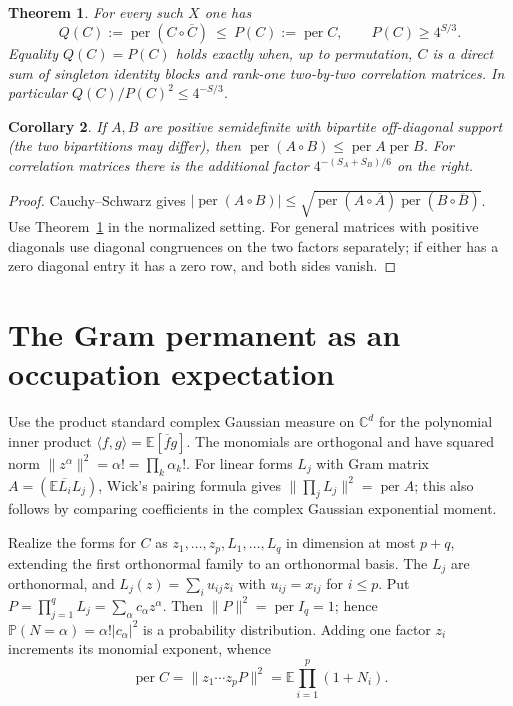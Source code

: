 \documentclass[11pt]{article}
\newcommand{\per}{\operatorname{per}}
\newcommand{\E}{\mathbb E}
\newtheorem{theorem}{Theorem}
\newtheorem{corollary}[theorem]{Corollary}
\begin{document}
\begin{theorem}\label{main}
For every such $X$ one has
\[
 Q(C):=\per(C\circ\overline C)\ \le\ P(C):=\per C,
 \qquad P(C)\ge4^{S/3}.
\]
Equality $Q(C)=P(C)$ holds exactly when, up to permutation, $C$ is a
direct sum of singleton identity blocks and rank-one two-by-two
correlation matrices. In particular $Q(C)/P(C)^2\le4^{-S/3}$.
\end{theorem}

\begin{corollary}
If $A,B$ are positive semidefinite with bipartite off-diagonal support
(the two bipartitions may differ), then $\per(A\circ B)\le\per A\per B$.
For correlation matrices there is the additional factor
$4^{-(S_A+S_B)/6}$ on the right.
\end{corollary}
\begin{proof}
Cauchy--Schwarz gives
$|\per(A\circ B)|\le\sqrt{\per(A\circ\overline A)\per(B\circ\overline B)}$.
Use Theorem~\ref{main} in the normalized setting. For general matrices
with positive diagonals use diagonal congruences on the two factors
separately; if either has a zero diagonal entry it has a zero row, and
both sides vanish.
\end{proof}

\section{The Gram permanent as an occupation expectation}
Use the product standard complex Gaussian measure on $\mathbb C^d$ for
the polynomial inner product $\langle f,g\rangle=\E[\overline f g]$.
The monomials are orthogonal and have squared norm
$\|z^\alpha\|^2=\alpha!=\prod_k\alpha_k!$. For linear forms $L_j$
with Gram matrix $A=(\E\overline{L_i}L_j)$, Wick's pairing formula gives
$\|\prod_j L_j\|^2=\per A$; this also follows by comparing
coefficients in the complex Gaussian exponential moment.

Realize the forms for $C$ as $z_1,\ldots,z_p,L_1,\ldots,L_q$
in dimension at most $p+q$, extending the first orthonormal family to
an orthonormal basis. The $L_j$ are orthonormal, and
$L_j(z)=\sum_i u_{ij}z_i$ with $u_{ij}=x_{ij}$ for $i\le p$.
Put $P=\prod_{j=1}^qL_j=\sum_\alpha c_\alpha z^\alpha$.
Then $\|P\|^2=\per I_q=1$; hence
$\mathbb P(N=\alpha)=\alpha!|c_\alpha|^2$ is a probability distribution.
Adding one factor $z_i$ increments its monomial exponent, whence
\begin{equation}\label{fock}
 \per C=\|z_1\cdots z_p P\|^2=\E\prod_{i=1}^p(1+N_i).
\end{equation}
\end{document}
